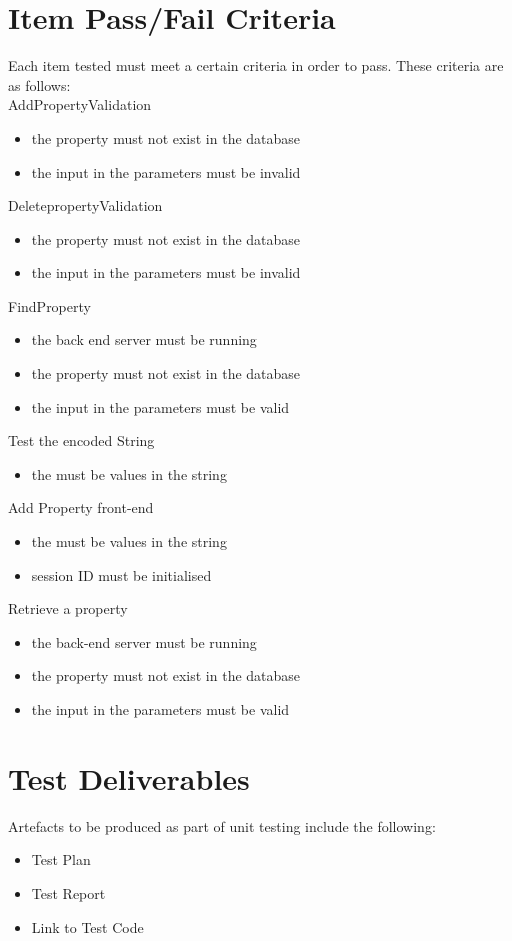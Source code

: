 \documentclass[a4paper,12pt]{article}
\begin{document}
\section{Item Pass/Fail Criteria}
Each item tested must meet a certain criteria in order to pass. These criteria are as follows:\\

AddPropertyValidation
\begin{itemize}
 \item the property must not exist in the database
 \item the input in the parameters must be invalid
\end{itemize}
DeletepropertyValidation
\begin{itemize}
 \item the property must not exist in the database
 \item the input in the parameters must be invalid
\end{itemize}
FindProperty
\begin{itemize}
 \item the back end server must be running
 \item the property must not exist in the database
 \item the input in the parameters must be valid
\end{itemize}
Test the encoded String 
\begin{itemize}
 \item the must be values in the string
\end{itemize}
Add Property front-end 
\begin{itemize}
 \item the must be values in the string
 \item session ID must be initialised
\end{itemize}
Retrieve a property
\begin{itemize}
 \item the back-end server must be running
 \item the property must not exist in the database
 \item the input in the parameters must be valid
\end{itemize}
\section{Test Deliverables}
Artefacts to be produced as part of unit testing include the following:
\begin{itemize}
\item Test Plan
\item Test Report
\item Link to Test Code
\end{itemize}
\end{document}
